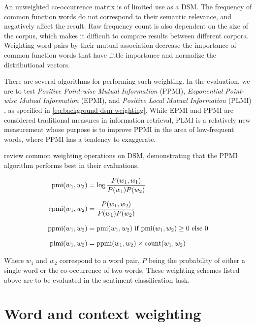 An unweighted co-occurrence matrix is of limited use as a DSM. The frequency of common function words do not correspond to their semantic relevance, and negatively affect the result. Raw frequency count is also dependent on the size of the corpus, which makes it difficult to compare results between different corpora. Weighting word pairs by their mutual association decrease the importance of common function words that have little importance and normalize the distributional vectors.

There are several algorithms for performing such weighting. In the evaluation, we are to test \emph{Positive Point-wise Mutual Information} (PPMI),  \emph{Exponential Point-wise Mutual Information} (EPMI), and \emph{Positive Local Mutual Information} (PLMI) \parencite{Baroni2010Distributional}, as specified in \cref{eq:background-dsm-weighting}. While EPMI and PPMI are considered traditional measures in information retrieval, PLMI is a relatively new measurement whose purpose is to improve PPMI in the area of low-frequent words, where PPMI has a tendency to exaggerate.

\textcite{Bullinaria2007Extracting} review common weighting operations on DSM, demonstrating that the PPMI algorithm performs best in their evaluations.

\begin{equation} \label{eq:background-dsm-weighting}
\begin{spreadlines}{10pt}
\begin{aligned}
    \mathrm{pmi}(w_1,w_2) &= \log\frac{P(w_1,w_1)}{P(w_1)P(w_2)} \\
    \mathrm{epmi}(w_1,w_2) &= \frac{P(w_1,w_2)}{P(w_1)P(w_2)} \\
    \mathrm{ppmi}(w_1,w_2) &= \mathrm{pmi}(w_1,w_2) \text{ if } \mathrm{pmi}(w_1,w_2)\geq 0 \text{ else } 0 \\
    \mathrm{plmi}(w_1,w_2) &= \mathrm{ppmi}(w_1,w_2) \times \mathrm{count}(w_1,w_2) \\
\end{aligned}
\end{spreadlines}
\end{equation}

Where $w_1$ and $w_2$ correspond to a word pair, $P$ being the probability of either a single word or the co-occurrence of two words. These weighting schemes listed above are to be evaluated in the sentiment classification task.

\section{Word and context weighting}\label{background-feature-weighting}

